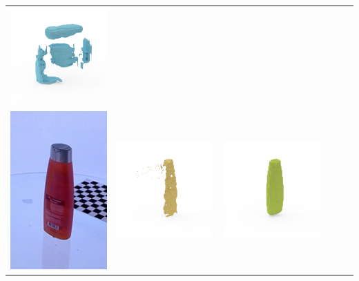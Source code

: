 \documentclass[10pt,onecolumn,letterpaper]{article}
\begin{document}
\begin{tabular}{cccccc}
\includegraphics[height=\turnheight, clip=true, trim=60 30 30 5]{sunkist_fruit_snacks_mixed_fruit_NP4_0_oma_view_90} \\
\includegraphics[height=\turnheight, clip=true, trim=20 30 30 5]{vo5_extra_body_volumizing_shampoo.png} &
\includegraphics[height=\turnheight, clip=true, trim=60 30 30 5]{vo5_extra_body_volumizing_shampoo_NP2_216_visible_pixels_view_0.png} &
\includegraphics[height=\turnheight, clip=true, trim=60 30 30 5]{vo5_extra_body_volumizing_shampoo_NP2_216_gt_view_0.png} &

\end{tabular}
\end{document}
